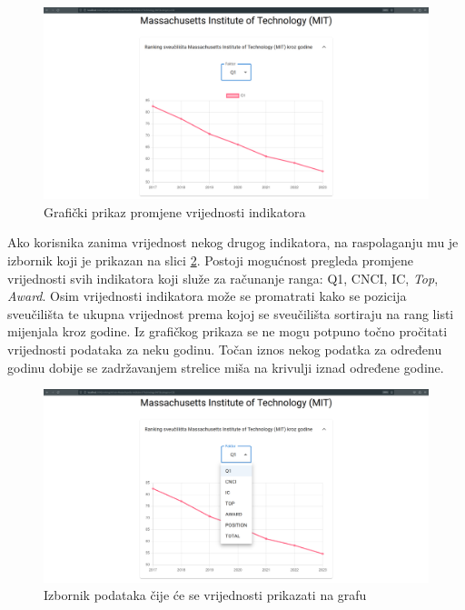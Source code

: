 \documentclass[times, utf8, zavrsni]{fer}
\begin{document}
\begin{figure}[htb]
    \centering
       \includegraphics[scale=0.17]{uni1.png} 
       \caption{Grafički prikaz promjene vrijednosti indikatora}
       \label{fig:unipage1}
       \end{figure}
       
Ako korisnika zanima vrijednost nekog drugog indikatora, na raspolaganju mu je izbornik 
koji je prikazan na slici \ref{fig:unipage2}. Postoji mogućnost pregleda promjene \\vrijednosti svih indikatora koji služe za računanje ranga: Q1, CNCI, IC, \emph{Top}, \emph{Award}. 
Osim vrijednosti indikatora može se promatrati kako se pozicija  \\sveučilišta te ukupna vrijednost  prema kojoj se sveučilišta 
sortiraju na rang listi mijenjala kroz godine. Iz grafičkog prikaza se ne mogu potpuno točno pročitati vrijednosti podataka za neku godinu. Točan iznos 
nekog podatka za određenu godinu dobije se zadržavanjem strelice miša na krivulji iznad određene godine.
\begin{figure}[htb]
    \centering
       \includegraphics[scale=0.17]{uni2.png} 
       \caption{Izbornik podataka čije će se vrijednosti prikazati na grafu}
       \label{fig:unipage2}
       \end{figure}
       \FloatBarrier
\end{document}
